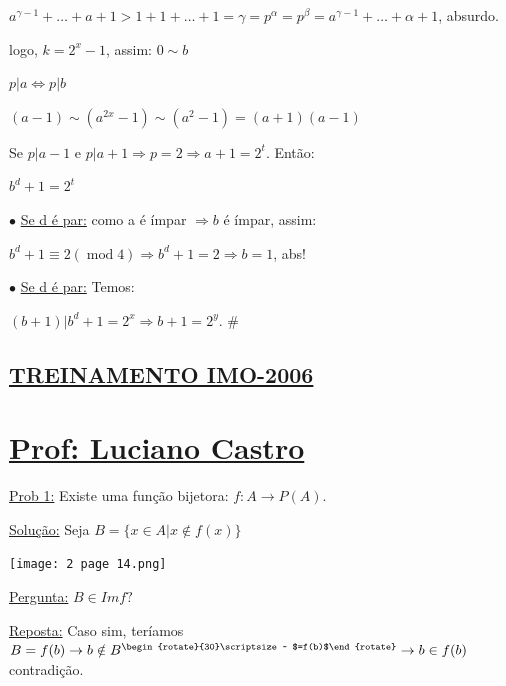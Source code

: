 \documentclass[a4paper,12pt]{article}
\theoremstyle{plain} %
\theoremstyle{definition} %
\theoremstyle{remark} %
\newcommand{\rotsupup}[1]{\begin{rotate}{30}\scriptsize ~#1\end{rotate}} %
\begin{document}
\begin{framed}
		$a^{\gamma-1}+\ldots+a+1>1+1+\ldots+1=\gamma=p^{\alpha}=p^{\beta}= a^{\gamma-1}+\ldots+\alpha+1$, absurdo.
		
		logo, $k=2^x-1$, assim: \hfill $0\sim b$
		
		\hfill $p|a \Leftrightarrow p|b$
		
		\vspace{-3em}\begin{center}
			$(a-1) \sim\left(a^{2 x}-1\right) \sim\left(a^{2}-1\right)=(a+1)(a-1)$ 
		\end{center} 
		
		Se $p|a-1$ e $p|a+1\Rightarrow p=2\Rightarrow a+1=2^t$. Ent\~ao:
		
		\begin{center}
			$b^d+1=2^t$
		\end{center}
		
		$\bullet$\hspace{1em} \underline{Se d \'e par:} como a \'e \'impar $\Rightarrow b$ \'e \'impar, assim:
		
		\begin{center}
			$b^{d}+1 \equiv 2(\operatorname{mod} 4) \Rightarrow b^{d}+1=2 \Rightarrow b=1$, abs!
		\end{center}
		
		$\bullet$\hspace{1em} \underline{Se d \'e par:} Temos:
		
		\begin{center}
			$(b+1)|b^d+1=2^x\Rightarrow b+1=2^y$. \huge\#
		\end{center}
		
		\normalsize
	\end{framed}
	
	\newpage
	\begin{center}
		\section*{\underline{TREINAMENTO IMO-2006}}
	\end{center}
	
	\section*{\underline{Prof: Luciano Castro}}
	
	\vspace{1ex}\underline{Prob 1:} Existe uma fun\c{c}\~ao bijetora: $f:A\rightarrow P(A)$.
	
	\begin{framed}
		\underline{Solu\c{c}\~ao:} Seja $B=\{x\in A|x\not\in f(x)\}$
		
		\begin{center}
			\texttt{[image: 2 page 14.png]}
		\end{center}
		
		\underline{Pergunta:} $B\in Imf?$
		
		\underline{Reposta:} Caso sim, ter\'iamos $B=f(b) \rightarrow b \notin B^{ \rotsupup{ $=f(b)$}} \rightarrow b \in f(b)$ contradi\c{c}\~ao. \tiny\textblock
		
		\normalsize
		
	\end{framed}
	
\end{document}
